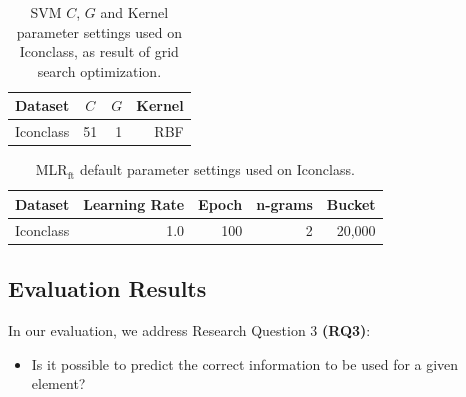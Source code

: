 \documentclass[epsfig,a4paper,12pt,titlepage]{book}
\newcommand{\mlr}{MLR$_\text{ft}$\xspace}
\begin{document}
\begin{table}[H]
		\caption{SVM $C$, $G$ and Kernel parameter settings used on Iconclass, as result of grid search optimization.}
		\label{tab:cohereSVM_par}       %
		\begin{center}
		\begin{tabular}{|l|r|r|r|} 
\hline
\multicolumn{1}{|c|}{Dataset} & \multicolumn{1}{|c|}{$C$} & \multicolumn{1}{|c|}{$G$} & \multicolumn{1}{|c|}{Kernel}  \\ 
\hline
Iconclass             & 51    & 1    & RBF        \\ \hline

\hline
\end{tabular}		    
		\end{center}
	\end{table}
	
\begin{table}[H]

\caption{\mlr default parameter settings used on Iconclass.}
		\label{tab:mlr_param_cohere}       %
\centering
\begin{tabular}{|l|r|r|r|r|} 
\hline
\multicolumn{1}{|c|}{Dataset} & \multicolumn{1}{|c|}{Learning Rate} & \multicolumn{1}{|c|}{Epoch} & \multicolumn{1}{|c|}{n-grams}& \multicolumn{1}{|c|}{Bucket}  \\ 
\hline
Iconclass             & 1.0    & 100    & 2 & 20,000        \\ \hline

\hline
\end{tabular}

\end{table}


\subsection{Evaluation Results}
\label{coherence_evaluation}

In our evaluation, we address Research Question 3 \textbf{(RQ3)}: 
\begin{itemize}
    \item Is it possible to predict the correct information to be used for a given element? 
\end{itemize}
\end{document}
